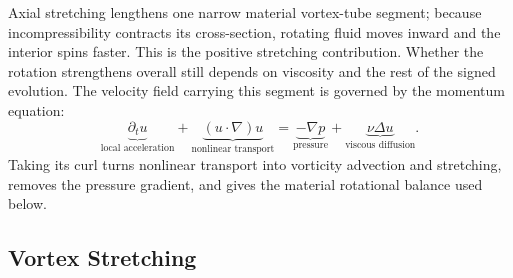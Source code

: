 
Axial stretching lengthens one narrow material vortex-tube segment; because incompressibility contracts its cross-section, rotating fluid moves inward and the interior spins faster. This is the positive stretching contribution. Whether the rotation strengthens overall still depends on viscosity and the rest of the signed evolution. The velocity field carrying this segment is governed by the momentum equation:
\[
  \underbrace{\partial_t u}_{\text{local acceleration}}
  +
  \underbrace{(u\cdot\nabla)u}_{\text{nonlinear transport}}
  =
  \underbrace{-\nabla p}_{\text{pressure}}
  +
  \underbrace{\nu\Delta u}_{\text{viscous diffusion}}.
\]
Taking its curl turns nonlinear transport into vorticity advection and stretching, removes the pressure gradient, and gives the material rotational balance used below.

\subsection{Vortex Stretching}\label{sub:ThePerfectlyStretchingVortex}

